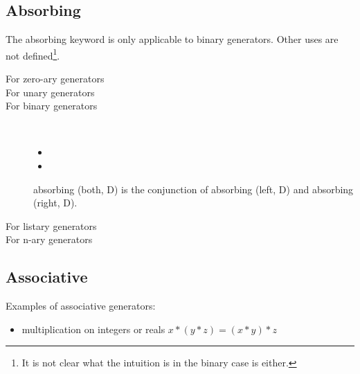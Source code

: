 

\subsection{Absorbing}
\label{sec:absorbing}

The absorbing keyword is only applicable to binary generators. Other
uses are not defined\footnote{It is not clear what the intuition is in the
binary case is either.}.
\begin{description}

\item[For zero-ary generators] \na
\item[For unary generators] \na
\item[For binary generators] ~
  \begin{itemize}
  \item {}
  \item {}
  \end{itemize}



absorbing (both, D) is the conjunction of absorbing (left, D) and
absorbing (right, D). 
\item[For listary generators] \na
\item[For n-ary generators] \na

\end{description}

\subsection{Associative}
\label{sec:associative}


Examples of associative generators:
\begin{itemize}
\item multiplication on integers or reals 
 $ x * ( y * z) = ( x * y ) * z $
\end{itemize}

